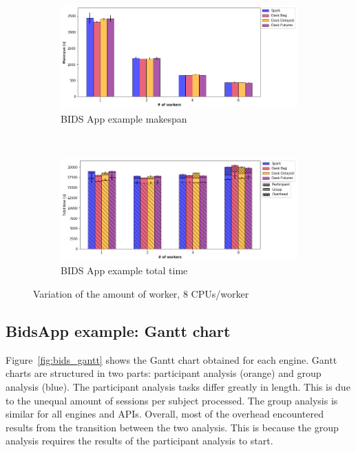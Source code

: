 \documentclass[conference]{IEEEtran}
\begin{document}
\begin{figure}[!t]
    \centering
    \begin{subfigure}[b]{\columnwidth}
        \includegraphics[clip,width=\columnwidth]{images/bids_worker.png}%
        \caption{BIDS App example makespan}\label{fig:bids_ms_worker}
    \end{subfigure}
    \\
    \begin{subfigure}[b]{\columnwidth}
        \includegraphics[clip,width=\columnwidth]{images/bids_idle_worker.png}%
        \caption{BIDS App example total time}\label{fig:bids_tt_worker}
    \end{subfigure}
    \caption{Variation of the amount of worker, 8 CPUs/worker}
\end{figure}


\subsection{BidsApp example: Gantt chart}
Figure~\ref{fig:bids_gantt} shows the Gantt chart obtained for each engine.
Gantt charts are structured in two parts: participant analysis (orange) and
group analysis (blue). The participant analysis tasks differ greatly in length. This
is due to the unequal amount of sessions per subject processed. The group analysis
is similar for all engines and APIs. Overall, most of the overhead encountered
results from the transition between the two analysis. This is because the group
analysis requires the results of the participant analysis to start.
\end{document}
